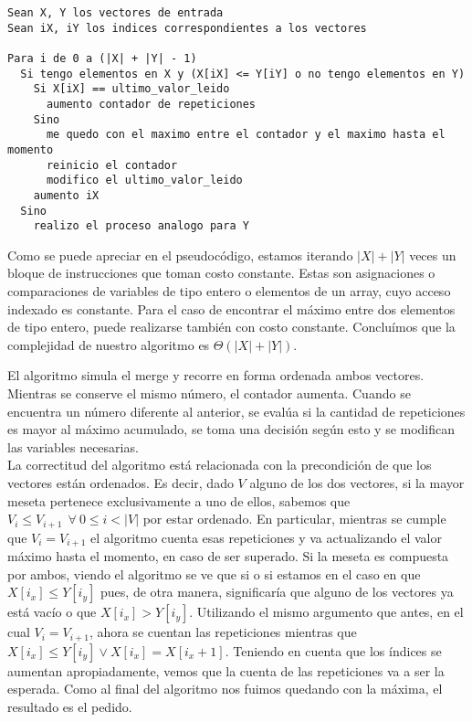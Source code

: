 \documentclass[10pt, a4paper,english,spanish]{article}
\begin{document}
\begin{verbatim}
Sean X, Y los vectores de entrada
Sean iX, iY los indices correspondientes a los vectores 

Para i de 0 a (|X| + |Y| - 1)
  Si tengo elementos en X y (X[iX] <= Y[iY] o no tengo elementos en Y)
    Si X[iX] == ultimo_valor_leido
      aumento contador de repeticiones
    Sino
      me quedo con el maximo entre el contador y el maximo hasta el momento
      reinicio el contador
      modifico el ultimo_valor_leido
    aumento iX
  Sino
    realizo el proceso analogo para Y
\end{verbatim}

Como se puede apreciar en el pseudocódigo, estamos iterando $|X|+|Y|$ veces un bloque de instrucciones
que toman costo constante. Estas son asignaciones o comparaciones de variables de tipo entero o
elementos de un array, cuyo acceso indexado es constante. Para el caso de encontrar el máximo 
entre dos elementos de tipo entero, puede realizarse también con costo constante. Concluímos
que la complejidad de nuestro algoritmo es $\Theta(|X| + |Y|)$.

El algoritmo simula el merge y recorre en forma ordenada ambos vectores.
Mientras se conserve el mismo número, el contador aumenta. Cuando se encuentra un número
diferente al anterior, se evalúa si la cantidad de repeticiones es mayor al máximo acumulado,
se toma una decisión según esto y se modifican las variables necesarias. \\
\indent La correctitud del algoritmo está relacionada con la precondición de que los vectores están ordenados.
Es decir, dado $V$ alguno de los dos vectores, si la mayor meseta pertenece exclusivamente a uno de ellos,
sabemos que $V_i \leq V_{i+1} \ \ \forall \ 0 \leq i < |V|$ por estar ordenado. En particular, mientras se cumple que
$V_i = V_{i+1}$ el algoritmo cuenta esas repeticiones y va actualizando el valor máximo hasta el momento,
en caso de ser superado. Si la meseta es compuesta por ambos, viendo el algoritmo se ve que si o si
estamos en el caso en que $X[i_x] \leq Y[i_y]$ pues, de otra manera, significaría que alguno de los vectores
ya está vacío o que $X[i_x] > Y[i_y]$. Utilizando el mismo argumento que antes, en el cual $V_i = V_{i+1}$,
ahora se cuentan las repeticiones mientras que $X[i_x] \leq Y[i_y] \lor X[i_x] = X[i_x+1]$. Teniendo en cuenta
que los índices se aumentan apropiadamente, vemos que la cuenta de las repeticiones va a ser la esperada. 
Como al final del algoritmo nos fuimos quedando con la máxima, el resultado es el pedido.
\end{document}
